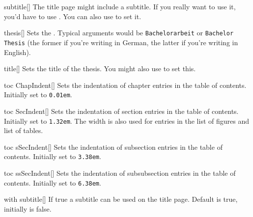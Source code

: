 \begin{describeopt}{subtitle}[]
  The title page might include a subtitle. If you really want to use it, you'd
  have to use . You can also use  to set it.
\end{describeopt}
\begin{describeopt}{thesis}[]
  Sets the . Typical arguments would be
  \texttt{Bachelorarbeit} or \texttt{Bachelor Thesis} (the former if you're
  writing in German, the latter if you're writing in English).
\end{describeopt}
\begin{describeopt}{title}[]
  Sets the title of the thesis. You might also use  to set this.
\end{describeopt}
\begin{describeopt}{toc ChapIndent}[]
  Sets the indentation of chapter entries in the table of contents. Initially
  set to \texttt{0.01em}.
\end{describeopt}
\begin{describeopt}{toc SecIndent}[]
  Sets the indentation of section entries in the table of contents. Initially
  set to \texttt{1.32em}. The width is also used for entries in the list of
  figures and list of tables.
\end{describeopt}
\begin{describeopt}{toc sSecIndent}[]
  Sets the indentation of subsection entries in the table of contents. Initially
  set to \texttt{3.38em}.
\end{describeopt}
\begin{describeopt}{toc ssSecIndent}[]
  Sets the indentation of subsubsection entries in the table of contents.
  Initially set to \texttt{6.38em}.
\end{describeopt}
\begin{describeopt}{with subtitle}[]
  If true a subtitle can be used on the title page. Default is true, initially
  is false.
\end{describeopt}

